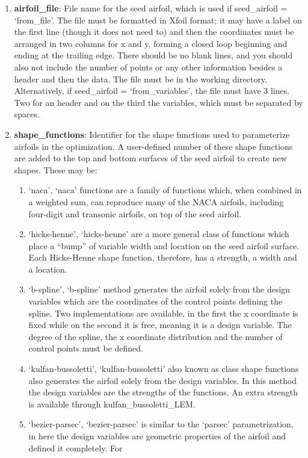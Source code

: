 \documentclass[11pt]{article}
\begin{document}
\begin{enumerate}
\item{\textbf{airfoil\_file}: File name for the seed airfoil, which is used if
seed\_airfoil = `from\_file'.  The file must be formatted in Xfoil format; it may have a
label on the first line (though it does not need to) and then the coordinates must be
arranged in two columns for x and y, forming a closed loop beginning and ending at the
trailing edge. There should be no blank lines, and you should also not include the number
of points or any other information besides a header and then the data.  The file must be
in the working directory. Alternatively, if 
seed\_airfoil = `from\_variables', the file must have 3 lines. Two for an header and on 
the third the variables, which must be separated by spaces.}
\item{\textbf{shape\_functions}: Identifier for the shape functions used to parameterize
airfoils in the optimization. A user-defined number of these shape functions are added 
to the top and bottom surfaces of the seed airfoil to create new shapes. These may be:
\begin{enumerate}
	\item `naca', `naca' functions are a family of functions which, when combined in a
	weighted sum, can reproduce many of the NACA airfoils, including four-digit and transonic
	airfoils, on top of the seed airfoil.
	\item `hicks-henne', `hicks-henne' are a more general class of functions which place a ``bump'' of
	variable width and location on the seed airfoil surface.  Each Hicks-Henne shape function,
	therefore, has a strength, a width and a location.
	\item `b-spline', `b-spline' method generates the airfoil solely from the design variables which
	are the coordinates of the control points defining the spline. Two implementations are 
	available, in the first the x coordinate is fixed while on the second it is free, meaning it
	is a design variable. The degree of the spline, the x coordinate distribution and the 
	number of control points must be defined.
	\item `kulfan-bussoletti', `kulfan-bussoletti' also known as class shape functions also
	generates the airfoil solely from the design variables. In this method the design variables
	are the strengths of the functions. An extra strength is available through kulfan\_bussoletti\_LEM.
	\item `bezier-parsec', `bezier-parsec' is similar to the `parsec' parametrization, in here
	the design variables are geometric properties of the airfoil and defined it completely. For 

\end{enumerate}}
\end{enumerate}
\end{document}
